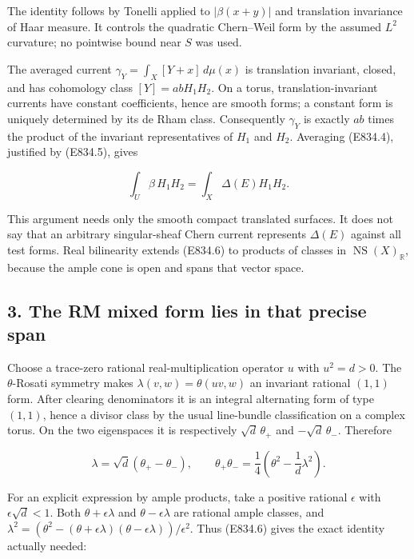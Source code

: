 The identity follows by Tonelli applied to \(|\beta(x+y)|\)
and translation invariance of Haar measure. It controls the quadratic
Chern--Weil form by the assumed \(L^2\) curvature; no pointwise bound near \(S\)
was used.

The averaged current \(\gamma_Y=\int_X[Y+x]\,d\mu(x)\) is
translation invariant, closed, and has cohomology class \([Y]=abH_1H_2\).
On a torus, translation-invariant currents have constant coefficients,
hence are smooth forms; a constant form is uniquely determined by its de
Rham class. Consequently \(\gamma_Y\) is exactly \(ab\) times the product of the
invariant representatives of \(H_1\) and \(H_2\). Averaging (E834.4), justified by
(E834.5), gives

\[
 \int_U\beta\,H_1H_2
   =\int_X\Delta(E)H_1H_2.
 \tag{E834.6}
\]

This argument needs only the smooth compact translated surfaces. It does
not say that an arbitrary singular-sheaf Chern current represents
\(\Delta(E)\) against all test forms. Real bilinearity extends (E834.6) to
products of classes in \(\operatorname{NS}(X)_{\mathbb R}\), because the ample cone is open and
spans that vector space.

\subsection{3. The RM mixed form lies in that precise
span}\label{SF-E834:the-rm-mixed-form-lies-in-that-precise-span}

Choose a trace-zero rational real-multiplication operator \(u\) with
\(u^2=d>0\). The \(\theta\)-Rosati symmetry makes \(\lambda(v,w)=\theta(uv,w)\) an invariant rational \((1,1)\) form. After clearing denominators it is
an integral alternating form of type \((1,1)\), hence a divisor class by the
usual line-bundle classification on a complex torus. On the two
eigenspaces it is respectively \(\sqrt d\,\theta_+\) and \(-\sqrt d\,\theta_-\).
Therefore

\[
 \lambda=\sqrt d(\theta_+-\theta_-),\qquad
 \theta_+\theta_-=\frac14\left(\theta^2-\frac1d\lambda^2\right).
 \tag{E834.7}
\]

For an explicit expression by ample products, take a positive rational
\(\epsilon\) with \(\epsilon\sqrt d<1\). Both \(\theta+\epsilon\lambda\) and \(\theta-\epsilon\lambda\) are rational ample classes, and
\(\lambda^2=(\theta^2-(\theta+\epsilon\lambda)(\theta-\epsilon\lambda))/\epsilon^2\).
Thus (E834.6) gives the exact identity actually needed:

